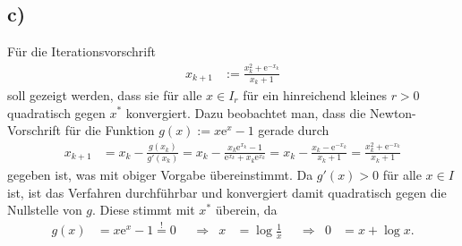 \documentclass[english, parskip=full]{scrartcl}
\newcommand{\e}{\text{e}}
\begin{document}
\subsection*{c)}
Für die Iterationsvorschrift
\begin{align}
x_{k+1} &:= \frac{x_k^2 + \e^{-x_k}}{x_k + 1}
\end{align}
soll gezeigt werden, dass sie für alle $x\in I_r$ für ein hinreichend kleines $r>0$ quadratisch gegen $x^\ast$ konvergiert.
Dazu beobachtet man, dass die Newton-Vorschrift für die Funktion $g(x) := x\e^{x} - 1$ gerade durch
\begin{align}
x_{k+1} &= x_k - \frac{g(x_k)}{g'(x_k)} = x_k - \frac{x_k\e^{x_k} - 1}{\e^{x_k} + x_k\e^{x_k}} = x_k - \frac{x_k - \e^{-x_k}}{x_k + 1} = \frac{x_k^2 + \e^{-x_k}}{x_k + 1}
\end{align}
gegeben ist, was mit obiger Vorgabe übereinstimmt.
Da $g'(x) > 0$ für alle $x\in I$ ist, ist das Verfahren durchführbar und konvergiert damit quadratisch gegen die Nullstelle von $g$.
Diese stimmt mit $x^\ast$ überein, da 
\begin{align}
g(x) &= x\e^x - 1 \overset{!}{=} 0 &&\Rightarrow& x &= \log\frac{1}{x} && \Rightarrow & 0 &= x + \log x.
\end{align}

\newpage
\end{document}
